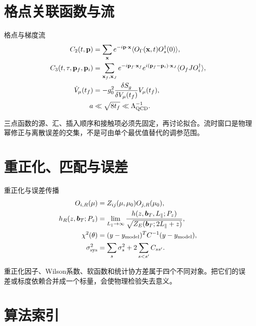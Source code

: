 \documentclass[UTF8,12pt,a4paper,twoside,openany]{ctexbook}
\newcommand{\bT}{\boldsymbol b_T}
\begin{document}
\section{格点关联函数与流}

\begin{keyformula}{格点与梯度流}
\begin{align}
  C_2(t,\mathbf p)
  &=\sum_{\mathbf x}e^{-i\mathbf p\cdot\mathbf x}
  \langle O_\Gamma(\mathbf x,t)O_s^\dagger(0)\rangle,
  \label{eq:handbook-c2}\\
  C_3(t,\tau,\mathbf p_f,\mathbf p_i)
  &=\sum_{\mathbf x_f,\mathbf x_J}
  e^{-i\mathbf p_f\cdot\mathbf x_f}
  e^{i(\mathbf p_f-\mathbf p_i)\cdot\mathbf x_J}
  \langle O_fJ O_i^\dagger\rangle,
  \label{eq:handbook-c3}\\
  \dot V_\mu(t_f)
  &=-g_0^2\frac{\delta S_g}{\delta V_\mu(t_f)}V_\mu(t_f),
  \label{eq:handbook-flow}\\
  a&\ll\sqrt{8t_f}\ll\Lambda_{\rm QCD}^{-1}.
  \label{eq:handbook-flow-window}
\end{align}
\end{keyformula}

三点函数的源、汇、插入顺序和接触项必须先固定，再讨论拟合。流时窗口是物理幂修正与离散误差的交集，不是可由单个最优值替代的调参范围。

\section{重正化、匹配与误差}

\begin{keyformula}{重正化与误差传播}
\begin{align}
  O_{i,R}(\mu)&=Z_{ij}(\mu,\mu_0)O_{j,R}(\mu_0),
  \label{eq:handbook-renorm}\\
  h_R(z,\bT;P_z)
  &=\lim_{L_\parallel\to\infty}
  \frac{h(z,\bT,L_\parallel;P_z)}
  {\sqrt{Z_E(\bT;2L_\parallel+z)}},
  \label{eq:handbook-wilson-ratio}\\
  \chi^2(\theta)
  &=(y-y_{\rm model})^TC^{-1}(y-y_{\rm model}),
  \label{eq:handbook-chi2}\\
  \sigma_{\rm sys}^2
  &=\sum_s\sigma_s^2+2\sum_{s<s'}C_{ss'}.
  \label{eq:handbook-sys}
\end{align}
\end{keyformula}

重正化因子、Wilson系数、软函数和统计协方差属于四个不同对象。把它们的误差或标度依赖合并成一个标量，会使物理检验失去意义。

\section{算法索引}
\end{document}

